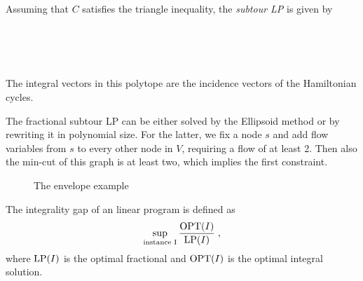\documentclass{skript}
\newcommand{\kant}{to node[at start, graph node]{}}
\begin{document}
\begin{definition}[Subtour LP]
    Assuming that $C$ satisfies the triangle inequality, the \emph{subtour LP} is given by
    \begin{linprog}\label{lp:subtour}
        \\
        \lpst{}\\
        \\
    \end{linprog}
    The integral vectors in this polytope are the incidence vectors of the Hamiltonian cycles.
\end{definition}

The fractional subtour LP can be either solved by the Ellipsoid method or by rewriting it in polynomial size.
For the latter, we fix a node $s$ and add flow variables from $s$ to every other node in $V$, requiring a flow of at least 2.
Then also the min-cut of this graph is at least two, which implies the first constraint.

\begin{figure}
    \centering
    \caption{The envelope example}\label{fig:envelope}
\end{figure}

\begin{definition}
    The integrality gap of an linear program is defined as
    \begin{align*}
        \sup_{\text{instance I}} \frac{\operatorname{OPT}(I)}{\operatorname{LP}(I)}\;,
    \end{align*}
    where $\operatorname{LP}(I)$ is the optimal fractional and $\operatorname{OPT}(I)$ is the optimal integral solution.
\end{definition}
\end{document}
